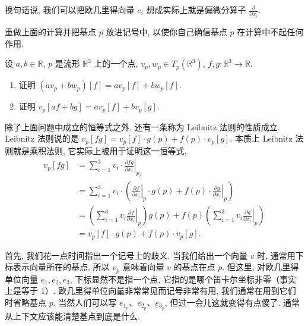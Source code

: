 \begin{center}
\end{center}

换句话说, 我们可以把欧几里得向量 $e_i$ 想成实际上就是偏微分算子 $\frac{\partial}{\partial x_i}$.

\begin{question}\label{q:2-5}
重做上面的计算并把基点 $p$ 放进记号中, 以使你自己确信基点 $p$ 在计算中不起任何作用.
\end{question}

\begin{question}\label{q:2-6}
设 $a,b\in\mathbb{R}$, $p$ 是流形 $\mathbb{R}^3$ 上的一个点, $v_p,w_p\in T_p(\mathbb{R}^3)$, $f,g:\mathbb{R}^3\to\mathbb{R}$.
\begin{enumerate}
  \item[(a)] 证明 $(av_p+bw_p)[f]=av_p[f]+bw_p[f]$.
  \item[(b)] 证明 $v_p[af+bg]=av_p[f]+bv_p[g]$.
\end{enumerate}
\end{question}

除了上面问题中成立的恒等式之外, 还有一条称为 Leibnitz 法则的性质成立. Leibnitz 法则说的是 $v_p[fg]=v_p[f]\cdot g(p)+f(p)\cdot v_p[g]$. 本质上 Leibnitz 法则就是乘积法则, 它实际上被用于证明这一恒等式, 
\begin{align*}
v_p[fg]&=\sum_{i=1}^{3}v_i\cdot\left.\frac{\partial fg}{\partial x_i}\right|_{p_i}\\
&=\sum_{i=1}^{3}v_i\cdot\left(\left.\frac{\partial f}{\partial x_i}\right|_{p}\cdot g(p)+f(p)\cdot\left.\frac{\partial g}{\partial x_i}\right|_{p}\right)\\
&=\left(\sum_{i=1}^{3}v_i\left.\frac{\partial f}{\partial x_i}\right|_{p}\right)g(p)+f(p)\left(\sum_{i=1}^{3}v_i\left.\frac{\partial g}{\partial x_i}\right|_{p}\right)\\
&=v_p[f]\cdot g(p)+f(p)\cdot v_p[g].
\end{align*}

首先, 我们花一点时间指出一个记号上的歧义. 当我们给出一个向量 $v$ 时, 通常用下标表示向量所在的基点, 所以 $v_p$ 意味着向量 $v$ 的基点在点 $p$. 但这里, 对欧几里得单位向量 $e_1,e_2,e_3$, 下标显然不是指一个点, 它指的是哪个笛卡尔坐标非零（事实上是等于 $1$）. 欧几里得单位向量非常常见而记号非常有用, 我们通常在用到它们时省略基点 $p$. 当然人们可以写 $e_{1_p}$、$e_{2_p}$、$e_{3_p}$, 但过一会儿这就变得有点傻了. 通常从上下文应该能清楚基点到底是什么.

